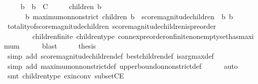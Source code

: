 \begin{isabellebody}
\ \ \isamarkupfalse%
\ {\isachardoublequoteopen}{\isasymforall}\ b\ {\isasymsigma}{\isachardot}\ b\ {\isasymin}\ C\ {\isasymand}\ {\isasymsigma}\ {\isasymin}\ {\isasymSigma}\ {\isasymlongrightarrow}\ children\ {\isacharparenleft}b{\isacharcomma}\ {\isasymsigma}{\isacharparenright}\ {\isasymnoteq}\ {\isasymemptyset}\ \isanewline
\ \ \ \ {\isasymlongrightarrow}\ {\isacharparenleft}{\isasymexists}\ b{\isacharprime}{\isachardot}\ maximum{\isacharunderscore}on{\isacharunderscore}non{\isacharunderscore}strict\ {\isacharparenleft}children\ {\isacharparenleft}b{\isacharcomma}\ {\isasymsigma}{\isacharparenright}{\isacharparenright}\ {\isacharparenleft}score{\isacharunderscore}magnitude{\isacharunderscore}children\ {\isasymsigma}\ b{\isacharparenright}\ b{\isacharprime}{\isacharparenright}{\isachardoublequoteclose}\ \ \isanewline
\ \ \ \ \isamarkupfalse%
\ totality{\isacharunderscore}of{\isacharunderscore}score{\isacharunderscore}magnitude{\isacharunderscore}children\ score{\isacharunderscore}magnitude{\isacharunderscore}children{\isacharunderscore}is{\isacharunderscore}preorder\isanewline
\ \ \ \ \ \ \ \ children{\isacharunderscore}finite\ children{\isacharunderscore}type\ connex{\isacharunderscore}preorder{\isacharunderscore}on{\isacharunderscore}finite{\isacharunderscore}non{\isacharunderscore}empty{\isacharunderscore}set{\isacharunderscore}has{\isacharunderscore}maximum\isanewline
\ \ \ \ \isamarkupfalse%
\ blast\isanewline
\ \ \isamarkupfalse%
\ \isamarkupfalse%
\ {\isacharquery}thesis\isanewline
\ \ \ \ \isamarkupfalse%
\ {\isacharparenleft}simp\ add{\isacharcolon}\ score{\isacharunderscore}magnitude{\isacharunderscore}children{\isacharunderscore}def\ best{\isacharunderscore}children{\isacharunderscore}def\ is{\isacharunderscore}arg{\isacharunderscore}max{\isacharunderscore}def{\isacharparenright}\isanewline
\ \ \ \ \isamarkupfalse%
\ {\isacharparenleft}simp\ add{\isacharcolon}\ maximum{\isacharunderscore}on{\isacharunderscore}non{\isacharunderscore}strict{\isacharunderscore}def\ upper{\isacharunderscore}bound{\isacharunderscore}on{\isacharunderscore}non{\isacharunderscore}strict{\isacharunderscore}def{\isacharparenright}\isanewline
\ \ \ \ \isamarkupfalse%
\ auto\isanewline
\ \ \ \ \isamarkupfalse%
\ {\isacharparenleft}smt\ children{\isacharunderscore}type\ ex{\isacharunderscore}in{\isacharunderscore}conv\ subsetCE{\isacharparenright}\isanewline
{}\isamarkupfalse%
%
\endisatagproof
{\isafoldproof}%

\end{isabellebody}
